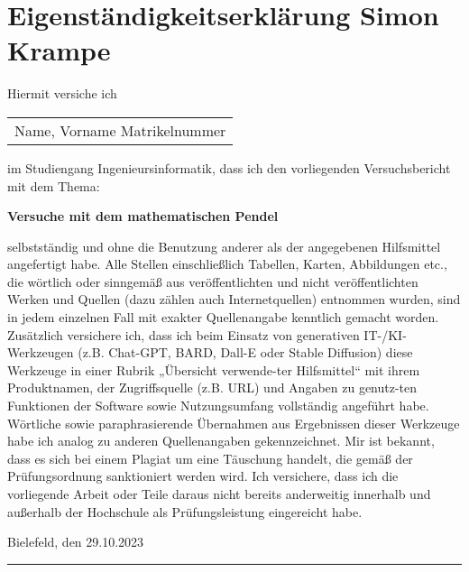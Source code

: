 \section*{Eigenständigkeitserklärung Simon Krampe}

Hiermit versiche ich\newline

\begin{tabular}{@{}l@{}}\hline
    Name, Vorname \hspace{8em} Matrikelnummer \hspace{2em}
\end{tabular}
\bigbreak
im Studiengang Ingenieursinformatik,\newline
dass ich den vorliegenden Versuchsbericht mit dem Thema:
\begin{center}
    \textbf{Versuche mit dem mathematischen Pendel}
\end{center}
selbstständig und ohne die Benutzung anderer als der angegebenen Hilfsmittel angefertigt habe. Alle Stellen einschließlich Tabellen, Karten, Abbildungen etc., die wörtlich oder sinngemäß aus veröffentlichten und nicht veröffentlichten Werken und Quellen (dazu zählen auch Internetquellen) entnommen wurden, sind in jedem einzelnen Fall mit exakter Quellenangabe kenntlich gemacht worden.\newline 
Zusätzlich versichere ich, dass ich beim Einsatz von generativen IT-/KI-Werkzeugen (z.B. Chat-GPT, BARD, Dall-E oder Stable Diffusion) diese Werkzeuge in einer Rubrik „Übersicht verwende-ter Hilfsmittel“ mit ihrem Produktnamen, der Zugriffsquelle (z.B. URL) und Angaben zu genutz-ten Funktionen der Software sowie Nutzungsumfang vollständig angeführt habe. Wörtliche sowie paraphrasierende Übernahmen aus Ergebnissen dieser Werkzeuge habe ich analog zu anderen Quellenangaben gekennzeichnet. Mir ist bekannt, dass es sich bei einem Plagiat um eine Täuschung handelt, die gemäß der Prüfungsordnung sanktioniert werden wird. Ich versichere, dass ich die vorliegende Arbeit oder Teile daraus nicht bereits anderweitig innerhalb und außerhalb der Hochschule als Prüfungsleistung eingereicht habe.\newline

Bielefeld, den 29.10.2023\noindent\hfill\rule{5cm}{.4pt}\par